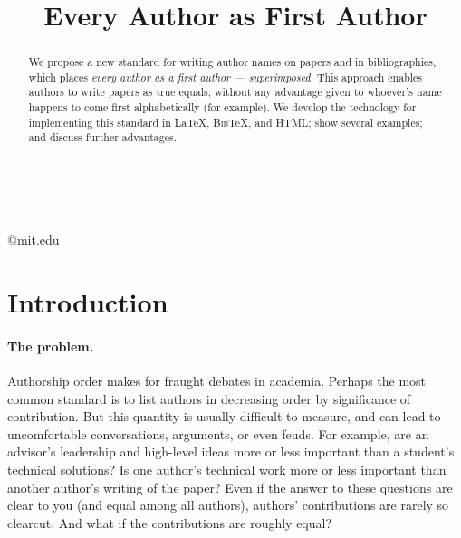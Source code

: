 \documentclass[natbib,authoryear]{sigtbd17-style}
\def\BibTeX{\textsc{Bib}\TeX}
\begin{document}
\title{Every Author as First Author}

%
%

{ \\
  \\
}
{@mit.edu}

\maketitle

\begin{abstract}
  We propose a new standard for writing author names on papers
  and in bibliographies, which places
  \emph{every author as a first author --- superimposed}.
  This approach enables authors to write papers as true equals,
  without any advantage given to whoever's name
  happens to come first alphabetically (for example).
  We develop the technology for implementing this standard
  in \LaTeX, \BibTeX, and HTML;
  show several examples; and discuss further advantages.
\end{abstract}

\section{Introduction}

\paragraph{The problem.}

Authorship order makes for fraught debates in academia.
Perhaps the most common standard is to list authors in decreasing order
by significance of contribution.
But this quantity is usually difficult to measure,
and can lead to uncomfortable conversations, arguments, or even feuds.
For example, are an advisor's leadership and high-level ideas
more or less important than a student's technical solutions?
Is one author's technical work more or less important than
another author's writing of the paper?
Even if the answer to these questions are clear to you
(and equal among all authors), authors' contributions are rarely so clearcut.
And what if the contributions are roughly equal?
\end{document}
